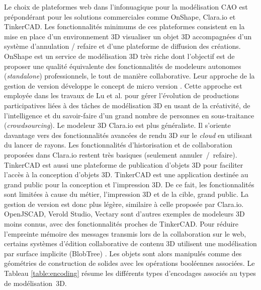 %
Le choix de plateformes web dans l'infonuagique pour la modélisation \gls{CAO} 
est prépondérant pour les solutions commerciales comme OnShape, Clara.io et 
TinkerCAD. Les fonctionnalités minimums de ces plateformes consistent en la 
mise en place d'un environnement 3D visualiser un objet 3D accompagnées d'un 
système d'annulation / refaire et d'une plateforme de 
diffusion des créations.
OnShape est un service de modélisation 3D très riche dont l'objectif est de 
proposer une qualité équivalente des fonctionnalités de modeleurs autonomes 
(\textit{standalone}) professionnels, le tout de manière collaborative. Leur approche 
de la gestion de version développe le concept de micro version \cite{Baran2015}. 
Cette approche est employée dans les travaux de Lu et al. \cite{Lu2016} pour 
gérer l'évolution de productions participatives liées à des tâches de modélisation 
3D en usant de la créativité, de l'intelligence et du savoir-faire 
d'un grand nombre de personnes en sous-traitance (\textit{crowdsourcing}). 
Le modeleur 3D Clara.io \cite{Houston2013} est plus généraliste. Il s'oriente 
davantage vers des fonctionnalités avancées de rendu 3D sur le \textit{cloud} en 
utilisant du lancer de rayons. 
Les fonctionnalités d'historisation et de collaboration proposées 
dans Clara.io restent très basiques (seulement annuler~/~refaire). TinkerCAD 
est aussi une plateforme de publication d'objets 3D pour faciliter l'accès à la 
conception d'objets 3D. 
TinkerCAD est une application destinée au grand 
public pour la conception et l'impression 3D. De ce fait, les fonctionnalités sont 
limitées à cause du métier, l'impression 3D et de la cible, grand public. La gestion 
de version est donc plus légère, similaire à celle proposée par Clara.io. 
OpenJSCAD, Verold Studio, Vectary sont d'autres 
exemples de modeleurs 3D moins connus, avec des fonctionnalités proches de 
TinkerCAD.
Pour réduire l'empreinte mémoire des messages transmis lors de la collaboration 
sur le web, certains systèmes d'édition collaborative de contenu 3D utilisent une 
modélisation par surface implicite (BlobTree) \cite{Grasberger2013}. 
Les objets sont alors manipulés comme des géométries de construction de 
solides avec les opérations booléennes associées. Le Tableau \ref{table:encoding} 
résume les différents types 
d'encodages associés au types de modélisation~3D. 

